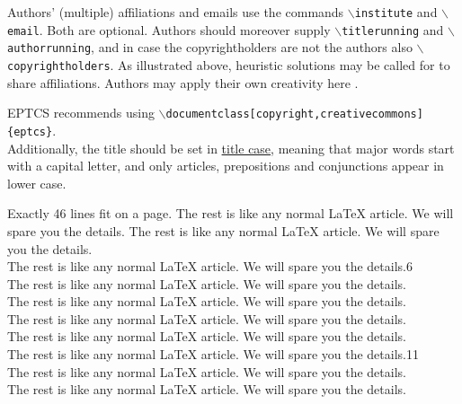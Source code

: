 \documentclass[submission,copyright,creativecommons]{eptcs}
\begin{document}
Authors' (multiple) affiliations and emails use the commands
{\tt $\backslash$institute} and {\tt $\backslash$email}.
Both are optional.
Authors should moreover supply
{\tt $\backslash$titlerunning} and {\tt $\backslash$authorrunning},
and in case the copyrightholders are not the authors also
{\tt $\backslash$copyrightholders}.
As illustrated above, heuristic solutions may be called for to share
affiliations. Authors may apply their own creativity here \cite{multipleauthors}.

EPTCS recommends using {\tt $\backslash$documentclass[copyright,creativecommons]\{eptcs\}}.\\
Additionally, the title should be set in \href{https://en.wikipedia.org/wiki/Title_case}{title case},
meaning that major words start with a capital letter, and only articles, prepositions and
conjunctions appear in lower case.

Exactly 46 lines fit on a page.
The rest is like any normal {\LaTeX} article.
We will spare you the details.
The rest is like any normal {\LaTeX} article.
We will spare you the details.\\
The rest is like any normal {\LaTeX} article.
We will spare you the details.\hfill6\\
The rest is like any normal {\LaTeX} article.
We will spare you the details.\\
The rest is like any normal {\LaTeX} article.
We will spare you the details.\\
The rest is like any normal {\LaTeX} article.
We will spare you the details.\\
The rest is like any normal {\LaTeX} article.
We will spare you the details.\\
The rest is like any normal {\LaTeX} article.
We will spare you the details.\hfill11\\
The rest is like any normal {\LaTeX} article.
We will spare you the details.\\
The rest is like any normal {\LaTeX} article.
We will spare you the details.
\end{document}
